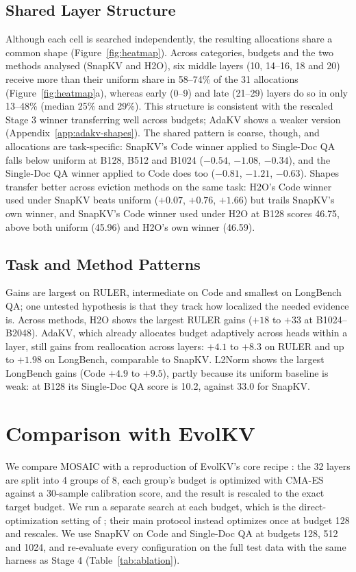 \documentclass[11pt]{article}
\begin{document}
\subsection{Shared Layer Structure}
\label{sec:shared}

Although each cell is searched independently, the resulting allocations share a common shape (Figure~\ref{fig:heatmap}). Across categories, budgets and the two methods analysed (SnapKV and H2O), six middle layers (10, 14--16, 18 and 20) receive more than their uniform share in 58--74\% of the 31 allocations (Figure~\ref{fig:heatmap}a), whereas early (0--9) and late (21--29) layers do so in only 13--48\% (median 25\% and 29\%). This structure is consistent with the rescaled Stage 3 winner transferring well across budgets; AdaKV shows a weaker version (Appendix~\ref{app:adakv-shapes}). The shared pattern is coarse, though, and allocations are task-specific: SnapKV's Code winner applied to Single-Doc QA falls below uniform at B128, B512 and B1024 ($-0.54$, $-1.08$, $-0.34$), and the Single-Doc QA winner applied to Code does too ($-0.81$, $-1.21$, $-0.63$). Shapes transfer better across eviction methods on the same task: H2O's Code winner used under SnapKV beats uniform ($+0.07$, $+0.76$, $+1.66$) but trails SnapKV's own winner, and SnapKV's Code winner used under H2O at B128 scores 46.75, above both uniform (45.96) and H2O's own winner (46.59).

\subsection{Task and Method Patterns}

Gains are largest on RULER, intermediate on Code and smallest on LongBench QA; one untested hypothesis is that they track how localized the needed evidence is. Across methods, H2O shows the largest RULER gains ($+18$ to $+33$ at B1024--B2048). AdaKV, which already allocates budget adaptively across heads within a layer, still gains from reallocation across layers: $+4.1$ to $+8.3$ on RULER and up to $+1.98$ on LongBench, comparable to SnapKV. L2Norm shows the largest LongBench gains (Code $+4.9$ to $+9.5$), partly because its uniform baseline is weak: at B128 its Single-Doc QA score is 10.2, against 33.0 for SnapKV.

\section{Comparison with EvolKV}

We compare MOSAIC with a reproduction of EvolKV's core recipe \citep{yu2025evolkv}: the 32 layers are split into 4 groups of 8, each group's budget is optimized with CMA-ES against a 30-sample calibration score, and the result is rescaled to the exact target budget. We run a separate search at each budget, which is the direct-optimization setting of \citet{yu2025evolkv}; their main protocol instead optimizes once at budget 128 and rescales. We use SnapKV on Code and Single-Doc QA at budgets 128, 512 and 1024, and re-evaluate every configuration on the full test data with the same harness as Stage 4 (Table~\ref{tab:ablation}).
\end{document}

